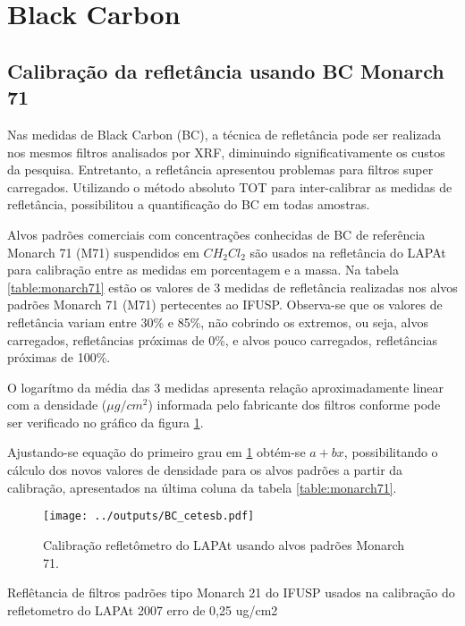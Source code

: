 \section{Black Carbon}

\subsection{Calibração da refletância usando BC Monarch 71}

Nas medidas de Black Carbon (BC), a técnica de refletância pode ser realizada nos mesmos filtros analisados por XRF, diminuindo significativamente os custos da pesquisa. Entretanto, a refletância apresentou problemas para filtros super carregados. Utilizando o método absoluto TOT para inter-calibrar as medidas de refletância, possibilitou a quantificação do BC em todas amostras.

Alvos padrões comerciais com concentrações conhecidas de BC de referência 
Monarch 71 (M71) suspendidos em $CH_2Cl_2$ \citep{clarke1986} são usados na 
refletância do LAPAt para calibração entre as medidas em porcentagem e a massa.
Na tabela \ref{table:monarch71} estão os valores de 3 medidas de refletância  
realizadas nos alvos padrões Monarch 71 (M71) pertecentes ao IFUSP.
Observa-se que os valores de refletância variam entre 30\% e 85\%, não cobrindo
os extremos, ou seja, alvos carregados, refletâncias próximas de 0\%, e alvos
pouco carregados, refletâncias próximas de 100\%.

O logarítmo da média das 3 medidas apresenta relação aproximadamente linear 
com a densidade ($\mu g /cm^2$) informada pelo fabricante dos filtros 
conforme pode ser verificado no gráfico da figura \ref{fig:monarch71}.

Ajustando-se equação do primeiro grau em \ref{fig:monarch71} obtém-se 
$a + bx$, possibilitando o cálculo dos novos valores de densidade para os 
alvos padrões a partir da calibração, apresentados na última coluna da tabela 
\ref{table:monarch71}.

\begin{figure}
  \centering
  \texttt{[image: ../outputs/BC\_cetesb.pdf]}
  \caption{Calibração refletômetro do LAPAt usando alvos padrões Monarch 71.
         \label{fig:monarch71}}
\end{figure}

\newpage
\begin{table}
  \centering
  \small
    
    \caption{Reflêtancia de filtros padrões tipo Monarch 21 \citep{clarke1986} 
           do IFUSP usados na calibração do refletometro do 
           LAPAt 2007  erro de 0,25 ug/cm2 \label{table:monarch71}}
\end{table} 

